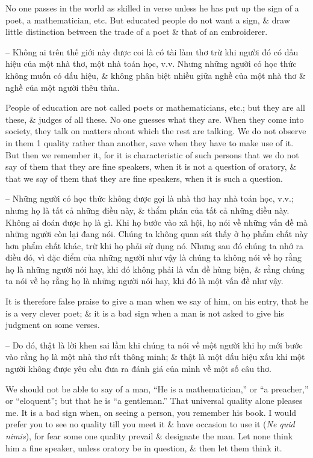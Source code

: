 \documentclass{article}
\begin{document}
\begin{enumerate}
\begin{itemize}
		 No one passes in the world as skilled in verse unless he has put up the sign of a poet, a mathematician, etc. But educated people do not want a sign, \& draw little distinction between the trade of a poet \& that of an embroiderer.
		
		-- Không ai trên thế giới này được coi là có tài làm thơ trừ khi người đó có dấu hiệu của một nhà thơ, một nhà toán học, v.v. Nhưng những người có học thức không muốn có dấu hiệu, \& không phân biệt nhiều giữa nghề của một nhà thơ \& nghề của một người thêu thùa.
		
		People of education are not called poets or mathematicians, etc.; but they are all these, \& judges of all these. No one guesses what they are. When they come into society, they talk on matters about which the rest are talking. We do not observe in them 1 quality rather than another, save when they have to make use of it. But then we remember it, for it is characteristic of such persons that we do not say of them that they are fine speakers, when it is not a question of oratory, \& that we say of them that they are fine speakers, when it is such a question.
		
		-- Những người có học thức không được gọi là nhà thơ hay nhà toán học, v.v.; nhưng họ là tất cả những điều này, \& thẩm phán của tất cả những điều này. Không ai đoán được họ là gì. Khi họ bước vào xã hội, họ nói về những vấn đề mà những người còn lại đang nói. Chúng ta không quan sát thấy ở họ phẩm chất này hơn phẩm chất khác, trừ khi họ phải sử dụng nó. Nhưng sau đó chúng ta nhớ ra điều đó, vì đặc điểm của những người như vậy là chúng ta không nói về họ rằng họ là những người nói hay, khi đó không phải là vấn đề hùng biện, \& rằng chúng ta nói về họ rằng họ là những người nói hay, khi đó là một vấn đề như vậy.
		
		It is therefore false praise to give a man when we say of him, on his entry, that he is a very clever poet; \& it is a bad sign when a man is not asked to give his judgment on some verses.
		
		-- Do đó, thật là lời khen sai lầm khi chúng ta nói về một người khi họ mới bước vào rằng họ là một nhà thơ rất thông minh; \& thật là một dấu hiệu xấu khi một người không được yêu cầu đưa ra đánh giá của mình về một số câu thơ.
		
		 We should not be able to say of a man, ``He is a mathematician,'' or ``a preacher,'' or ``eloquent''; but that he is ``a gentleman.'' That universal quality alone pleases me. It is a bad sign when, on seeing a person, you remember his book. I would prefer you to see no quality till you meet it \& have occasion to use it ({\it Ne quid nimis}), for fear some one quality prevail \& designate the man. Let none think him a fine speaker, unless oratory be in question, \& then let them think it.
		

\end{itemize}
\end{enumerate}
\end{document}

